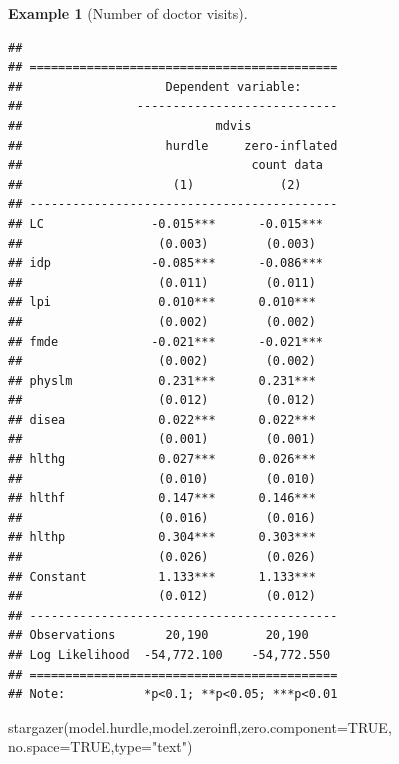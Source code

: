 \documentclass[
  12pt,
]{book}
\newenvironment{Shaded}{\begin{snugshade}}{\end{snugshade}}
\newcommand{\AttributeTok}[1]{\textcolor[rgb]{0.77,0.63,0.00}{#1}}
\newcommand{\ConstantTok}[1]{\textcolor[rgb]{0.00,0.00,0.00}{#1}}
\newcommand{\FunctionTok}[1]{\textcolor[rgb]{0.00,0.00,0.00}{#1}}
\newcommand{\NormalTok}[1]{#1}
\newcommand{\StringTok}[1]{\textcolor[rgb]{0.31,0.60,0.02}{#1}}
\theoremstyle{definition}
\theoremstyle{definition}
\newtheorem{example}{Example}[chapter]
\theoremstyle{definition}
\theoremstyle{definition}
\theoremstyle{remark}
\begin{document}
\begin{example}[Number of doctor visits]
\begin{verbatim}
## 
## ===========================================
##                    Dependent variable:     
##                ----------------------------
##                           mdvis            
##                    hurdle     zero-inflated
##                                count data  
##                     (1)            (2)     
## -------------------------------------------
## LC               -0.015***      -0.015***  
##                   (0.003)        (0.003)   
## idp              -0.085***      -0.086***  
##                   (0.011)        (0.011)   
## lpi               0.010***      0.010***   
##                   (0.002)        (0.002)   
## fmde             -0.021***      -0.021***  
##                   (0.002)        (0.002)   
## physlm            0.231***      0.231***   
##                   (0.012)        (0.012)   
## disea             0.022***      0.022***   
##                   (0.001)        (0.001)   
## hlthg             0.027***      0.026***   
##                   (0.010)        (0.010)   
## hlthf             0.147***      0.146***   
##                   (0.016)        (0.016)   
## hlthp             0.304***      0.303***   
##                   (0.026)        (0.026)   
## Constant          1.133***      1.133***   
##                   (0.012)        (0.012)   
## -------------------------------------------
## Observations       20,190        20,190    
## Log Likelihood  -54,772.100    -54,772.550 
## ===========================================
## Note:           *p<0.1; **p<0.05; ***p<0.01
\end{verbatim}

\begin{Shaded}
\begin{Highlighting}[]
\FunctionTok{stargazer}\NormalTok{(model.hurdle,model.zeroinfl,}\AttributeTok{zero.component=}\ConstantTok{TRUE}\NormalTok{,}
          \AttributeTok{no.space=}\ConstantTok{TRUE}\NormalTok{,}\AttributeTok{type=}\StringTok{"text"}\NormalTok{)}
\end{Highlighting}
\end{Shaded}


\end{example}
\end{document}
